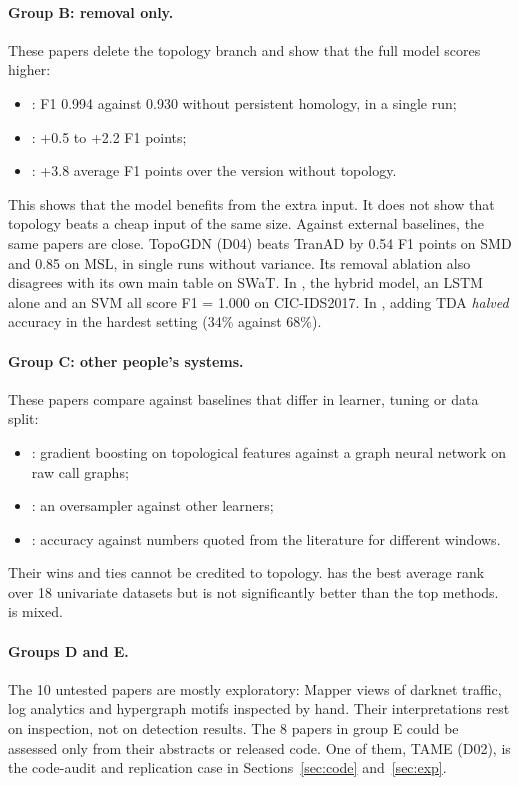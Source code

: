\paragraph{Group B: removal only.} These papers delete the topology branch and show that the full model scores higher:
\begin{itemize}
  \item {}: F1 0.994 against 0.930 without persistent homology, in a single run;
  \item {}: +0.5 to +2.2 F1 points;
  \item {}: +3.8 average F1 points over the version without topology.
\end{itemize}
This shows that the model benefits from the extra input. It does not show that topology beats a cheap input of the same size. Against external baselines, the same papers are close. TopoGDN (D04) beats TranAD by 0.54 F1 points on SMD and 0.85 on MSL, in single runs without variance. Its removal ablation also disagrees with its own main table on SWaT. In , the hybrid model, an LSTM alone and an SVM all score F1 = 1.000 on CIC-IDS2017. In , adding TDA \emph{halved} accuracy in the hardest setting (34\% against 68\%).

\paragraph{Group C: other people's systems.} These papers compare against baselines that differ in learner, tuning or data split:
\begin{itemize}
  \item {}: gradient boosting on topological features against a graph neural network on raw call graphs;
  \item {}: an oversampler against other learners;
  \item {}: accuracy against numbers quoted from the literature for different windows.
\end{itemize}
Their wins and ties cannot be credited to topology.  has the best average rank over 18 univariate datasets but is not significantly better than the top methods.  is mixed.

\paragraph{Groups D and E.} The 10 untested papers are mostly exploratory: Mapper views of darknet traffic, log analytics and hypergraph motifs inspected by hand. Their interpretations rest on inspection, not on detection results. The 8 papers in group E could be assessed only from their abstracts or released code. One of them, TAME (D02), is the code-audit and replication case in Sections~\ref{sec:code} and~\ref{sec:exp}.


